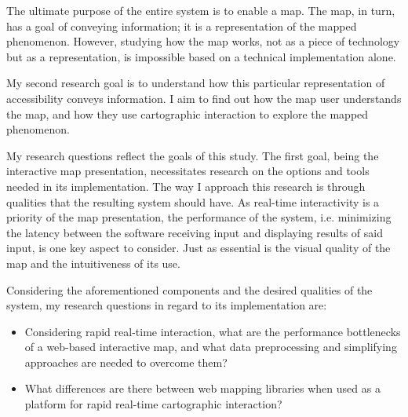 The ultimate purpose of the entire system is to enable a map.
The map, in turn, has a goal of conveying information;
it is a representation of the mapped phenomenon.
However, studying how the map works,
not as a piece of technology but as a representation,
is impossible based on a technical implementation alone.

My second research goal is to understand how
this particular representation of accessibility conveys information.
I aim to find out how the map user understands the map,
and how they use cartographic interaction to explore the mapped phenomenon.


My research questions reflect the goals of this study.  %
The first goal, being the interactive map presentation,
necessitates research on the options and tools
needed in its implementation.
The way I approach this research is through qualities
that the resulting system should have.
As real-time interactivity is a priority of the map presentation,
the performance of the system,
i.e. minimizing the latency between
the software receiving input and displaying results of said input,
is one key aspect to consider.
Just as essential is the visual quality of the map
and the intuitiveness of its use.



Considering the aforementioned components
and the desired qualities of the system,
my research questions in regard to its implementation are:

\begin{itemize}
	\item Considering rapid real-time interaction,
	what are the performance bottlenecks of
	a web-based interactive map,
	and what data preprocessing and simplifying approaches
	are needed to overcome them?
	\item What differences are there between web mapping libraries
	when used as a platform for rapid real-time cartographic interaction?
\end{itemize}  %

